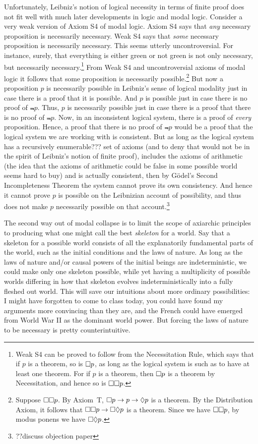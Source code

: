 Unfortunately, Leibniz's notion of logical necessity in terms of finite proof does not fit well with much later developments in logic and modal logic.
Consider a very weak version of Axiom S4 of modal logic. Axiom S4 says that \textit{any} necessary proposition is necessarily necessary.
Weak S4 says that \textit{some} necessary proposition is necessarily necessary. This seems utterly uncontroversial. For instance, surely, that 
everything is either green or not green is not only necessary, but necessarily necessary.\footnote{Weak S4 can be proved to follow from 
the Necessitation Rule, which says that if $p$ is a theorem, so is $\Box p$, as long as the logical system is such as to have at least one theorem.
For if $p$ is a theorem, then $\Box p$ is a theorem by Necessitation, and hence so is $\Box\Box p$.} From Weak S4 and uncontroversial axioms
of modal logic it follows that some proposition is necessarily possible.\footnote{Suppose $\Box\Box p$. By Axiom~T, $\Box p \rightarrow p \rightarrow \Diamond p$
is a theorem. By the Distribution Axiom, it follows that $\Box\Box p \rightarrow \Box\Diamond p$ is a theorem. Since we have $\Box\Box p$, by
modus ponens we have $\Box\Diamond p$.} But now a proposition $p$ is necessarily possible in Leibniz's sense of logical modality just in case 
there is a proof that it is possible. And $p$ is possible just in case there is no proof of $\Not p$. Thus, $p$ is necessarily possible
just in case there is a proof that there is no proof of $\Not p$. Now, in an inconsistent logical system, there is a proof of \textit{every}
proposition. Hence, a proof that there is no proof of $\Not p$ would be a proof that the logical system we are working with is consistent.
But as long as the logical system has a recursively enumerable??? set of axioms (and to deny that would not be in the spirit of Leibniz's
notion of finite proof), includes the axioms of arithmetic (the idea that the axioms of arithmetic could be false in some possible world
seems hard to buy) and is actually consistent, then by G\"odel's Second Incompleteness Theorem the system cannot prove its own consistency.
And hence it cannot prove $p$ is possible on the Leibnizian account of possibility, and thus does not make $p$ necessarily possible on that
account.\footnote{??discuss objection paper}

The second way out of modal collapse is to limit the scope of axiarchic principles to producing what one might call the best 
\textit{skeleton} for a world. Say that a skeleton for a possible world consists of all the explanatorily fundamental parts
of the world, such as the initial conditions and the laws of nature. As long as the laws of nature and/or causal powers of 
the initial beings are indeterministic, we could make only one skeleton possible, while yet having a multiplicity of possible 
worlds differing in how that skeleton evolves indeterministically into a fully fleshed out world. This will save our intuitions
about more ordinary possibilities: I might have forgotten to come to class today, you could have found my arguments more convincing
than they are, and the French could have emerged from World War II as the dominant world power. But forcing the laws of nature to 
be necessary is pretty counterintuitive. 

